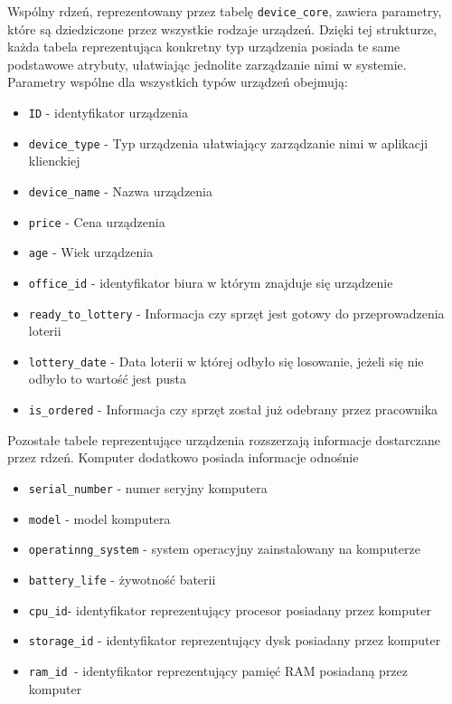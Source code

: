 Wspólny rdzeń, reprezentowany przez tabelę \texttt{device\_core}, zawiera parametry, które są dziedziczone przez wszystkie rodzaje urządzeń. Dzięki tej strukturze, każda tabela reprezentująca konkretny typ urządzenia posiada te same podstawowe atrybuty, ułatwiając jednolite zarządzanie nimi w systemie. Parametry wspólne dla wszystkich typów urządzeń obejmują: 
\begin{itemize}
	\item \texttt{ID} - identyfikator urządzenia
	\item \texttt{device\_type} - Typ urządzenia ułatwiający zarządzanie nimi w aplikacji klienckiej
	\item \texttt{device\_name} - Nazwa urządzenia
	\item \texttt{price} - Cena urządzenia
	\item \texttt{age} - Wiek urządzenia
	\item \texttt{office\_id} - identyfikator biura w którym znajduje się urządzenie
	\item \texttt{ready\_to\_lottery} - Informacja czy sprzęt jest gotowy do przeprowadzenia loterii
	\item \texttt{lottery\_date} - Data loterii w której odbyło się losowanie, jeżeli się nie odbyło to wartość jest pusta
	\item \texttt{is\_ordered} - Informacja czy sprzęt został już odebrany przez pracownika
\end{itemize}

Pozostałe tabele reprezentujące urządzenia rozszerzają informacje dostarczane przez rdzeń. Komputer dodatkowo posiada informacje odnośnie
\begin{itemize}
	\item \texttt{serial\_number} - numer seryjny komputera
	\item \texttt{model} - model komputera
	\item \texttt{operatinng\_system} - system operacyjny zainstalowany na komputerze
	\item \texttt{battery\_life} - żywotność baterii
	\item \texttt{cpu\_id}- identyfikator reprezentujący procesor posiadany przez komputer
	\item \texttt{storage\_id} - identyfikator reprezentujący dysk posiadany przez komputer
	\item \texttt{ram\_id }- identyfikator reprezentujący pamięć RAM posiadaną przez komputer
\end{itemize}

